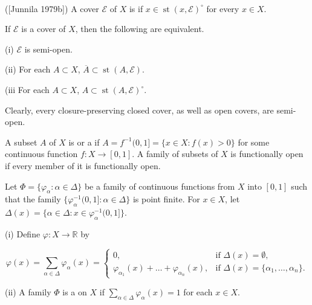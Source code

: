 \documentclass[prelim.tex]{subfiles}
\begin{document}
{ \label{def:1.3.4}
(\textup{[Junnila 1979b]\textsuperscript{\cite{Junnila1979b}})} 
A cover $\mathscr{E}$ of $X$ is 
if $x \in  \operatorname{st}(x, \mathscr{E})^\circ$ for every $x \in X$.

} %

{\lemma{} \label{lem:1.3.5}
If $\mathscr{E}$ is a cover of $X$, then the following are equivalent.

\textup{(i)}  $\mathscr{E}$ is semi-open.

\textup{(ii)} For each $A \subset X$, 
$\overline{A} \subset \operatorname{st}(A, \mathscr{E})$.

\textup{(iii} For each $A \subset X$, $A \subset  \operatorname{st}(A, \mathscr{E})^\circ$.
\hfill \qedsymbol
}

\vspace{8pt}
Clearly, every closure-preserving closed cover, as well as open covers, are semi-open.


{ \label{def:1.3.6}
A subset $A$ of $X$ is 
or a 
if $A = f^{-1}(0, 1] = \{x \in X: f(x) > 0\}$ for some continuous function 
$f: X \rightarrow [0, 1]$.
A family of subsets of $X$ is functionally open if every member of it is functionally open.
}%


{ \label{def:1.3.7}
Let $\Phi = \{\varphi_\alpha: \alpha \in \Delta\}$ be a family of continuous functions from $X$ into $[0, 1]$ such that the family 
$\{\varphi_\alpha^{-1}(0, 1]: \alpha \in \Delta\}$ is point finite. 
For $x \in X$, let $\Delta(x) = \{\alpha \in \Delta: x \in\varphi_\alpha^{-1}(0, 1]\}$.

\textup{(i)} Define $\varphi: X \rightarrow \mathbb{R}$ by 

$$\varphi(x) = \sum_{\alpha \in \Delta} \varphi_\alpha(x) = 
\begin{cases} 0, 
	& \text{if } \Delta(x) = \emptyset, 
	\\ \varphi_{\alpha_1}(x) + \dots + \varphi_{\alpha_n}(x), 
	& \text{if } \Delta(x) = \{\alpha_1, \dots, \alpha_n\}. 
\end{cases}$$

\textup{(ii)} A family $\Phi$ is a 
 on $X$ if $\sum_{\alpha \in \Delta} \varphi_\alpha(x) = 1$ for each $x \in X$.
}
\end{document}
